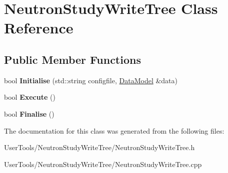\hypertarget{classNeutronStudyWriteTree}{
\section{NeutronStudyWriteTree Class Reference}
\label{classNeutronStudyWriteTree}
}
\subsection*{Public Member Functions}
\begin{DoxyCompactItemize}
\item 
\hypertarget{classNeutronStudyWriteTree_a6fa5e7ec01a703b7589583e8c5af744d}{
bool {\bfseries Initialise} (std::string configfile, \hyperlink{classDataModel}{DataModel} \&data)}
\label{classNeutronStudyWriteTree_a6fa5e7ec01a703b7589583e8c5af744d}

\item 
\hypertarget{classNeutronStudyWriteTree_a9e89fb86ad252f39f5f173e0bd8f3528}{
bool {\bfseries Execute} ()}
\label{classNeutronStudyWriteTree_a9e89fb86ad252f39f5f173e0bd8f3528}

\item 
\hypertarget{classNeutronStudyWriteTree_ad11e2482834166c4630ddf4cd8fd6d38}{
bool {\bfseries Finalise} ()}
\label{classNeutronStudyWriteTree_ad11e2482834166c4630ddf4cd8fd6d38}

\end{DoxyCompactItemize}


The documentation for this class was generated from the following files:\begin{DoxyCompactItemize}
\item 
UserTools/NeutronStudyWriteTree/NeutronStudyWriteTree.h\item 
UserTools/NeutronStudyWriteTree/NeutronStudyWriteTree.cpp\end{DoxyCompactItemize}
